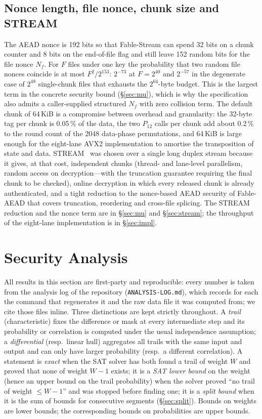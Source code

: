 \documentclass{iacrtrans}
\newcommand{\FableAEAD}{\textsf{Fable-AEAD}\xspace}
\newcommand{\FableStream}{\textsf{Fable-Stream}\xspace}
\newcommand{\PP}[1]{P_{#1}}
\newcommand{\repo}{\texttt{ANALYSIS-LOG.md}\xspace}
\begin{document}
\subsection{Nonce length, file nonce, chunk size and STREAM}
\label{sec:whystream}
The AEAD nonce is 192 bits so that \FableStream can spend 32 bits on a chunk counter and 8 bits on the end-of-file flag and still leave 152 random bits for the file nonce $N_f$. For $F$ files under one key the probability that two random file nonces coincide is at most $F^2/2^{153}$: $2^{-73}$ at $F = 2^{40}$ and $2^{-57}$ in the degenerate case of $2^{48}$ single-chunk files that exhausts the $2^{64}$-byte budget. This is the largest term in the concrete security bound (\S\ref{sec:mu}), which is why the specification also admits a caller-supplied structured $N_f$ with zero collision term. The default chunk of 64\,KiB is a compromise between overhead and granularity: the 32-byte tag per chunk is 0.05\,\% of the data, the two $\PP{12}$ calls per chunk add about 0.2\,\% to the round count of the 2048 data-phase permutations, and 64\,KiB is large enough for the eight-lane AVX2 implementation to amortise the transposition of state and data. STREAM~\cite{HRRV15} was chosen over a single long duplex stream because it gives, at that cost, independent chunks (thread- and lane-level parallelism, random access on decryption---with the truncation guarantee requiring the final chunk to be checked), online decryption in which every released chunk is already authenticated, and a tight reduction to the nonce-based AEAD security of \FableAEAD that covers truncation, reordering and cross-file splicing. The STREAM reduction and the nonce term are in \S\ref{sec:mu} and \S\ref{sec:stream}; the throughput of the eight-lane implementation is in \S\ref{sec:impl}.

\section{Security Analysis}
\label{sec:security}

All results in this section are first-party and reproducible: every number is taken from the analysis log of the repository (\repo), which records for each the command that regenerates it and the raw data file it was computed from; we cite those files inline. Three distinctions are kept strictly throughout. A \emph{trail} (characteristic) fixes the difference or mask at every intermediate step and its probability or correlation is computed under the usual independence assumption; a \emph{differential} (resp.\ linear hull) aggregates all trails with the same input and output and can only have larger probability (resp.\ a different correlation). A statement is \emph{exact} when the SAT solver has both found a trail of weight $W$ and proved that none of weight $W-1$ exists; it is a \emph{SAT lower bound} on the weight (hence an upper bound on the trail probability) when the solver proved ``no trail of weight $\leq W-1$'' and was stopped before finding one; it is a \emph{split bound} when it is the sum of bounds for consecutive segments (\S\ref{sec:split}). Bounds on weights are lower bounds; the corresponding bounds on probabilities are upper bounds.
\end{document}

